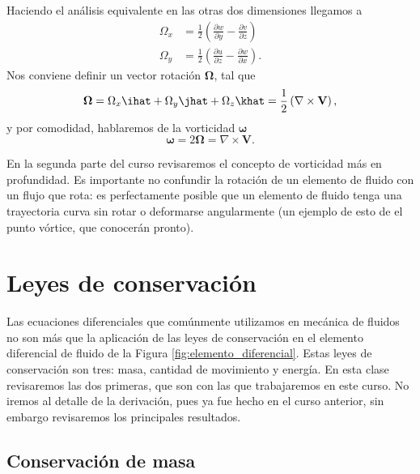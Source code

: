 Haciendo el análisis equivalente en las otras dos dimensiones llegamos a
%
\begin{align}
\Omega_x &= \frac{1}{2}\left(\frac{\partial w}{\partial y} -\frac{\partial v}{\partial z}\right) \nonumber \\
\Omega_y &= \frac{1}{2}\left(\frac{\partial u}{\partial z} -\frac{\partial w}{\partial x}\right).
\end{align}
%
Nos conviene definir un vector rotación $\boldsymbol{\Omega}$, tal que
%
\begin{equation}
\boldsymbol{\Omega} = \Omega_x \ihat + \Omega_y \jhat + \Omega_z \khat = \frac{1}{2}\left(\nabla\times\mathbf{V}\right),
\end{equation}
%
y por comodidad, hablaremos de la vorticidad $\boldsymbol{\omega}$
%
\begin{equation}\label{eq:vorticidad}
\boldsymbol{\omega} = 2\boldsymbol{\Omega} = \nabla\times\mathbf{V}.
\end{equation}

En la segunda parte del curso revisaremos el concepto de vorticidad más en profundidad.
Es importante no confundir la rotación de un elemento de fluido con un flujo que rota: es perfectamente posible que un elemento de fluido tenga una trayectoria curva sin rotar o deformarse angularmente (un ejemplo de esto de el punto vórtice, que conocerán pronto).

\section*{Leyes de conservación}

Las ecuaciones diferenciales que comúnmente utilizamos en mecánica de fluidos no son más que la aplicación de las leyes de conservación en el elemento diferencial de fluido de la Figura \ref{fig:elemento_diferencial}.
Estas leyes de conservación son tres: masa, cantidad de movimiento y energía.
En esta clase revisaremos las dos primeras, que son con las que trabajaremos en este curso. 
No iremos al detalle de la derivación, pues ya fue hecho en el curso anterior, sin embargo revisaremos los principales resultados.

\subsection*{Conservación de masa}

